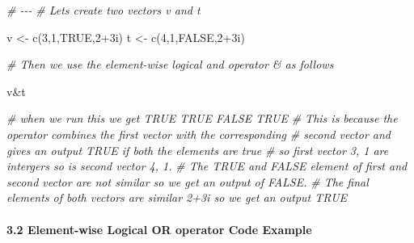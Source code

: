 \documentclass[
]{article}
\newenvironment{Shaded}{\begin{snugshade}}{\end{snugshade}}
\newcommand{\CommentTok}[1]{\textcolor[rgb]{0.56,0.35,0.01}{\textit{#1}}}
\newcommand{\ConstantTok}[1]{\textcolor[rgb]{0.00,0.00,0.00}{#1}}
\newcommand{\DecValTok}[1]{\textcolor[rgb]{0.00,0.00,0.81}{#1}}
\newcommand{\FunctionTok}[1]{\textcolor[rgb]{0.00,0.00,0.00}{#1}}
\newcommand{\NormalTok}[1]{#1}
\newcommand{\OtherTok}[1]{\textcolor[rgb]{0.56,0.35,0.01}{#1}}
\newcommand{\SpecialCharTok}[1]{\textcolor[rgb]{0.00,0.00,0.00}{#1}}
\begin{document}
\begin{Shaded}
\begin{Highlighting}[]
\CommentTok{\# {-}{-}{-}}
\CommentTok{\# Lets create two vectors v and t}

\NormalTok{v }\OtherTok{\textless{}{-}} \FunctionTok{c}\NormalTok{(}\DecValTok{3}\NormalTok{,}\DecValTok{1}\NormalTok{,}\ConstantTok{TRUE}\NormalTok{,}\DecValTok{2}\SpecialCharTok{+}\NormalTok{3i)}
\NormalTok{t }\OtherTok{\textless{}{-}} \FunctionTok{c}\NormalTok{(}\DecValTok{4}\NormalTok{,}\DecValTok{1}\NormalTok{,}\ConstantTok{FALSE}\NormalTok{,}\DecValTok{2}\SpecialCharTok{+}\NormalTok{3i)}

\CommentTok{\# Then we use the element{-}wise logical and operator \& as follows}

\NormalTok{v}\SpecialCharTok{\&}\NormalTok{t}

\CommentTok{\# when we run this we get TRUE  TRUE FALSE  TRUE}
\CommentTok{\# This is because the operator combines the first vector with the corresponding }
\CommentTok{\# second vector and gives an output TRUE if both the elements are true}
\CommentTok{\# so first vector 3, 1 are intergers so is second vector 4, 1. }
\CommentTok{\# The TRUE and FALSE element of first and second vector are not similar so we get an output of FALSE.}
\CommentTok{\# The final elements of both vectors are similar 2+3i so we get an output TRUE}
\end{Highlighting}
\end{Shaded}

\hypertarget{element-wise-logical-or-operator-code-example}{%
\paragraph{3.2 Element-wise Logical OR operator Code
Example}\label{element-wise-logical-or-operator-code-example}}
\end{document}
